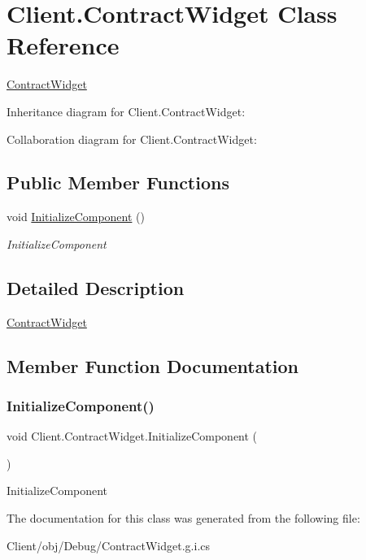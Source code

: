 \hypertarget{class_client_1_1_contract_widget}{}\section{Client.\+Contract\+Widget Class Reference}
\label{class_client_1_1_contract_widget}


\hyperlink{class_client_1_1_contract_widget}{Contract\+Widget}  




Inheritance diagram for Client.\+Contract\+Widget\+:


Collaboration diagram for Client.\+Contract\+Widget\+:
\subsection*{Public Member Functions}
\begin{DoxyCompactItemize}
\item 
void \hyperlink{class_client_1_1_contract_widget_a5c71fc93a4f7495e4f0581d8f87f3bf7}{Initialize\+Component} ()
\begin{DoxyCompactList}\small\item\em Initialize\+Component \end{DoxyCompactList}\end{DoxyCompactItemize}


\subsection{Detailed Description}
\hyperlink{class_client_1_1_contract_widget}{Contract\+Widget} 



\subsection{Member Function Documentation}
\mbox{\label{class_client_1_1_contract_widget_a5c71fc93a4f7495e4f0581d8f87f3bf7}} 
\subsubsection{\texorpdfstring{Initialize\+Component()}{InitializeComponent()}}
{\footnotesize\ttfamily void Client.\+Contract\+Widget.\+Initialize\+Component (\begin{DoxyParamCaption}{ }\end{DoxyParamCaption})\hspace{0.3cm}{\ttfamily [inline]}}



Initialize\+Component 



The documentation for this class was generated from the following file\+:\begin{DoxyCompactItemize}
\item 
Client/obj/\+Debug/Contract\+Widget.\+g.\+i.\+cs\end{DoxyCompactItemize}
